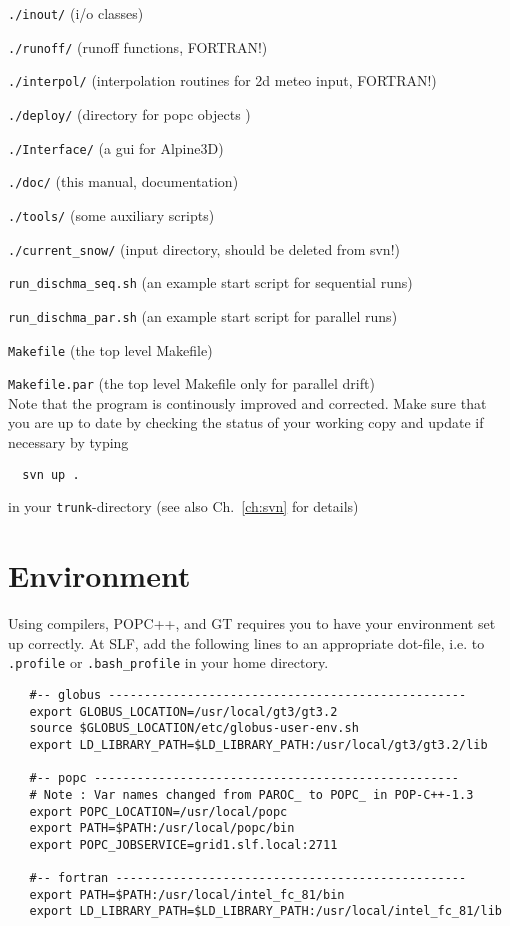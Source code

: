 \documentclass[12pt]{report}
\begin{document}
\verb+./inout/+ (i/o classes)

\verb+./runoff/+ (runoff functions, FORTRAN!)

\verb+./interpol/+ (interpolation routines for 2d meteo input, FORTRAN!)

\verb+./deploy/+ (directory for popc objects )

\verb+./Interface/+ (a gui for Alpine3D)

\verb+./doc/+ (this manual, documentation)

\verb+./tools/+ (some auxiliary scripts)

\verb+./current_snow/+ (input directory, should be deleted from svn!)

\verb+run_dischma_seq.sh+ (an example start script for sequential runs)

\verb+run_dischma_par.sh+ (an example start script for parallel runs)

\verb+Makefile+ (the top level Makefile)

\verb+Makefile.par+ (the top level Makefile only for parallel drift)
\\[1ex]

\noindent Note that the program is continously improved and corrected.
Make sure that you are up to date by checking the status of your
working copy and update if necessary by typing
\begin{verbatim}
  svn up .
\end{verbatim}
in your \verb+trunk+-directory (see also Ch.\ \ref{ch:svn} for details)


\section{Environment}

Using compilers, POPC++, and GT requires you to have your environment
set up correctly. At SLF, add the following lines to an appropriate
dot-file, i.e. to \verb+.profile+ or \verb+.bash_profile+ in your home
directory.

\begin{verbatim}
   #-- globus --------------------------------------------------
   export GLOBUS_LOCATION=/usr/local/gt3/gt3.2
   source $GLOBUS_LOCATION/etc/globus-user-env.sh
   export LD_LIBRARY_PATH=$LD_LIBRARY_PATH:/usr/local/gt3/gt3.2/lib

   #-- popc ---------------------------------------------------
   # Note : Var names changed from PAROC_ to POPC_ in POP-C++-1.3
   export POPC_LOCATION=/usr/local/popc
   export PATH=$PATH:/usr/local/popc/bin
   export POPC_JOBSERVICE=grid1.slf.local:2711

   #-- fortran -------------------------------------------------
   export PATH=$PATH:/usr/local/intel_fc_81/bin
   export LD_LIBRARY_PATH=$LD_LIBRARY_PATH:/usr/local/intel_fc_81/lib
\end{verbatim}
\end{document}

